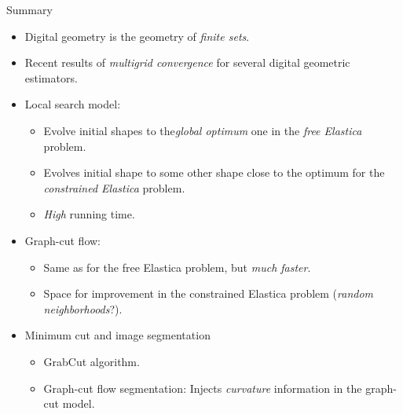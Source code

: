 \begin{frame}
	{Summary}	

	\begin{itemize}
		\item<1->{Digital geometry is the geometry of \emph{finite sets}.}
		\item<2->{Recent results of \emph{multigrid convergence} for several digital geometric estimators.}		
		\item<3->{Local search model:}				
		\begin{itemize}
			\item<3->{Evolve initial shapes to the\emph{global optimum} one in the \emph{free Elastica} problem.}
			\item<4->{Evolves initial shape to some other shape close to the optimum for the \emph{constrained Elastica} problem.}				
			\item<5->{\emph{High} running time.}
		\end{itemize}
		
		\item<6->{Graph-cut flow:}
			\begin{itemize}
				\item<6->{Same as for the free Elastica problem, but \emph{much faster}.}
				\item<7->{Space for improvement in the constrained Elastica problem (\emph{random neighborhoods}?).}				
			\end{itemize}

		\item<8->{Minimum cut and image segmentation}
		\begin{itemize}
			\item<9->{GrabCut algorithm.}
			\item<10->{Graph-cut flow segmentation: Injects \emph{curvature} information in the graph-cut model.}
		\end{itemize}
	\end{itemize}
		
\end{frame}

